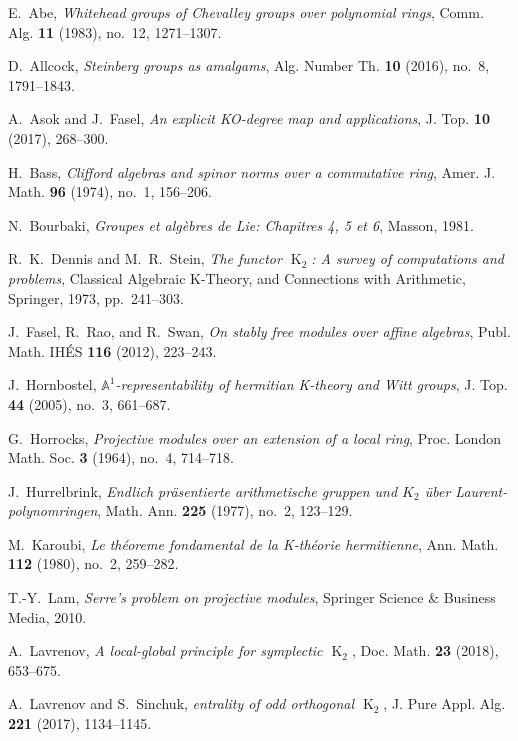 \documentclass[10pt,a4paper,twoside]{article}
\theoremstyle{remark}
\theoremstyle{definition}
\numberwithin{lemma}{section}
\numberwithin{prop}{section}
\numberwithin{corollary}{section}
\numberwithin{externaltheorem}{section}
\DeclareMathOperator{\K}{K}
\numberwithin{equation}{section}
\begin{document}
\begin{thebibliography}{1000}
 E.~Abe, 
 \emph{Whitehead groups of {C}hevalley groups over polynomial rings},
 Comm. Alg. \textbf{11} (1983), no.~12, 1271--1307.

 D.~Allcock, 
 \emph{Steinberg groups as amalgams},
 Alg. Number Th. \textbf{10} (2016), no.~8, 1791--1843.

 A.~Asok and J.~Fasel, 
 \emph{An explicit KO-degree map and applications},
 J. Top. \textbf{10} (2017), 268--300.

 H.~Bass, 
 \emph{Clifford algebras and spinor norms over a commutative ring},
 Amer. J. Math. \textbf{96} (1974), no.~1, 156--206.

 N.~Bourbaki, 
 \emph{Groupes et algèbres de Lie: Chapitres 4, 5 et 6},
 Masson, 1981.

 R.~K.~Dennis and M.~R.~Stein,
 \emph{The functor $\K_2$: A survey of computations and problems},
 Classical Algebraic K-Theory, and Connections with Arithmetic, Springer, 1973, pp.~241--303.

 J.~Fasel, R.~Rao, and R.~Swan,
 \emph{On stably free modules over affine algebras},
 Publ. Math. IH{\'E}S \textbf{116} (2012), 223--243.

 J.~Hornbostel, 
 \emph{$\mathbb{A}^1$-representability of hermitian K-theory and Witt groups},
 J. Top. \textbf{44} (2005), no.~3, 661--687.

 G.~Horrocks, 
 \emph{Projective modules over an extension of a local ring},
 Proc. London Math. Soc. \textbf{3} (1964), no.~4, 714--718.

 J.~Hurrelbrink, 
 \emph{Endlich pr\"asentierte arithmetische gruppen und $K_{2}$ {\"u}ber Laurent-polynomringen},
 Math. Ann. \textbf{225} (1977), no.~2, 123--129.

 M.~Karoubi, 
 \emph{Le th{\'e}oreme fondamental de la K-th{\'e}orie hermitienne},
 Ann. Math. \textbf{112} (1980), no.~2, 259--282.

 T.-Y.~Lam, 
 \emph{Serre's problem on projective modules},
 Springer Science \& Business Media, 2010.

 A.~Lavrenov, 
 \emph{A local-global principle for symplectic $\K_2$},
 Doc. Math. \textbf{23} (2018), 653--675.

 A.~Lavrenov and S.~Sinchuk,
 \emph{entrality of odd orthogonal $\K_2$},
 J. Pure Appl. Alg. \textbf{221} (2017), 1134--1145.


\end{thebibliography}
\end{document}
